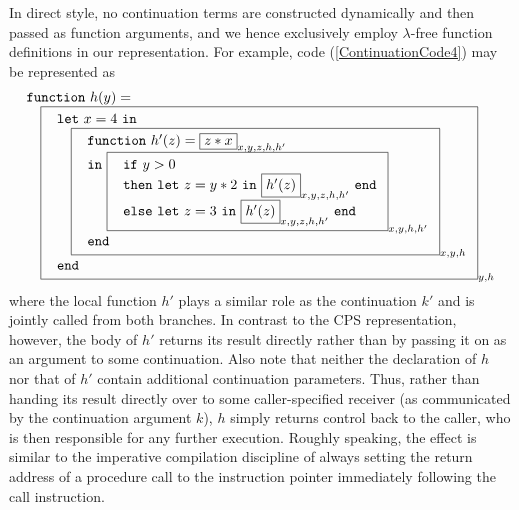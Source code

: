 In direct style, no continuation terms are constructed dynamically and
then passed as function arguments, and we hence exclusively employ
$\lambda$-free function definitions in our representation. For
example, code (\ref{ContinuationCode4}) may be represented as
\begin{equation}
\label{DirectStyleCode1}
\begin{array}{l}
\mathtt{function}\ h (y) =\\
\quad
  \fbox{
    $\begin{array}{l}
       \mathtt{let}\ x=4\ \mathtt{in} \\
       \quad \fbox{
               $\begin{array}{l}
                  \mathtt{function}\ h' (z) = \fbox{$z*x$}_{x,y,z,h,h'} \\
                  \mathtt{in}\
                    \fbox{
                     $\begin{array}[t]{l}
                        \mathtt{if}\ y>0\\
                        \mathtt{then\ let}\ z = y*2\ \mathtt{in}\ 
                              \fbox{$h'(z)$}_{x,y,z,h,h'}\ \mathtt{end}\\
                        \mathtt{else\ let}\ z = 3\ \mathtt{in}\ 
                              \fbox{$h'(z)$}_{x,y,z,h,h'}\ \mathtt{end}
                      \end{array}$}_{x,y,h,h'}\\
                  \mathtt{end}
                \end{array}$}_{x,y,h}\\
       \mathtt{end}
     \end{array}$}_{y, h}
\end{array}
\end{equation}
where the local function $h'$ plays a similar role as the continuation
$k'$ and is jointly called from both branches. In contrast to the CPS
representation, however, the body of $h'$ returns its result directly
rather than by passing it on as an argument to some continuation. Also
note that neither the declaration of $h$ nor that of $h'$ contain
additional continuation parameters. Thus, rather than handing its
result directly over to some caller-specified receiver (as
communicated by the continuation argument $k$), $h$ simply returns
control back to the caller, who is then responsible for any further
execution. Roughly speaking, the effect is similar to the imperative
compilation discipline of always setting the return address of a
procedure call to the instruction pointer immediately following the
call instruction.

